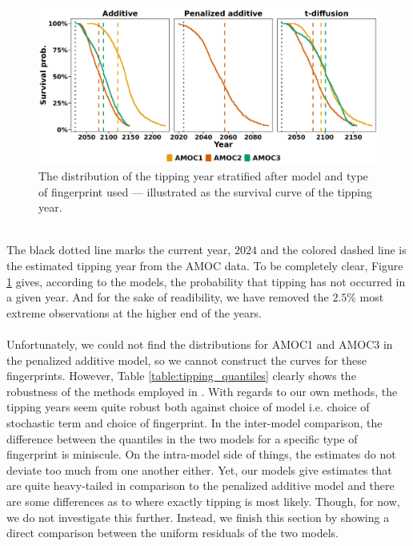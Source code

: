 \begin{figure}[h!]
    \begin{center}
        \includegraphics[scale = .096]{figures/surival_curve_first97.5.jpeg}
        \caption{The distribution of the tipping year stratified after model and type of fingerprint used — illustrated as the survival curve of the tipping year.}
        \label{figure:surival_curve_taus}
    \end{center}
\end{figure}\\
The black dotted line marks the current year, $2024$ and the colored dashed line is the estimated tipping year from the AMOC data. To be completely clear, Figure \ref{figure:surival_curve_taus} gives, according to the models, the probability that tipping has not occurred in a given year. And for the sake of readibility, we have removed the $2.5\%$ most extreme observations at the higher end of the years.\\\\
Unfortunately, we could not find the distributions for AMOC1 and AMOC3 in the penalized additive model, so we cannot construct the curves for these fingerprints. However, Table \ref{table:tipping_quantiles} clearly shows the robustness of the methods employed in \cite{Ditlevsen2023}. With regards to our own methods, the tipping years seem quite robust both against choice of model i.e. choice of stochastic term and choice of fingerprint. In the inter-model comparison, the difference between the quantiles in the two models for a specific type of fingerprint is miniscule. On the intra-model side of things, the estimates do not deviate too much from one another either. Yet, our models give estimates that are quite heavy-tailed in comparison to the penalized additive model and there are some differences as to where exactly tipping is most likely. Though, for now, we do not investigate this further.
\newpage
\noindent Instead, we finish this section by showing a direct comparison between the uniform residuals of the two models.
